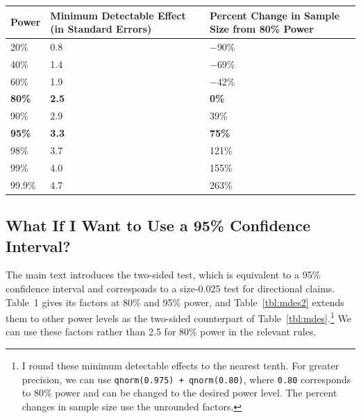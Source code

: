 \documentclass[12pt]{article}
\let\origtable\table
\let\endorigtable\endtable
\renewenvironment{table}[1][]{\origtable[htbp]}{\endorigtable}
\newcommand{\headrow}{}
\begin{document}
\begin{table}[h]
\centering
\caption{This table shows the minimum detectable effect, in standard errors, for a variety of power levels. We can use these values to find the minimum detectable effect for power levels other than 80\% and 95\% (as in Rule~\ref{rule:se-to-mde}). We can also use these factors rather than 2.5 for 80\% power (or 3.3 for 95\% power) in the relevant rules. For convenience, this table also shows the percent change in sample size required to change the statistical power from 80\% to the various levels.}\label{tbl:mdes}
\footnotesize %
\renewcommand{\tabularxcolumn}[1]{>{\centering\arraybackslash}m{#1}} %
\setlength{\extrarowheight}{4pt} %
\begin{tabularx}{\linewidth}{XXX} %
\toprule
\headrow \textbf{Power} & \textbf{Minimum Detectable Effect (in Standard Errors)} & \textbf{Percent Change in Sample Size from 80\% Power} \\
\midrule
20\%   & 0.8 & $-$90\% \\
40\%   & 1.4 & $-$69\% \\
60\%   & 1.9 & $-$42\% \\
\textbf{80\%}   & \textbf{2.5} & \textbf{0\%} \\
90\%   & 2.9 & 39\% \\
\textbf{95\%}   & \textbf{3.3} & \textbf{75\%} \\
98\%   & 3.7 & 121\% \\
99\%   & 4.0 & 155\% \\
99.9\%  & 4.7 & 263\% \\
\bottomrule
\end{tabularx}
\end{table}

\subsection*{What If I Want to Use a 95\% Confidence Interval?}

The main text introduces the two-sided test, which is equivalent to a 95\% confidence interval and corresponds to a size-0.025 test for directional claims.
Table~1 gives its factors at 80\% and 95\% power, and Table~\ref{tbl:mdes2} extends them to other power levels as the two-sided counterpart of Table~\ref{tbl:mdes}.\footnote{
  I round these minimum detectable effects to the nearest tenth.
  For greater precision, we can use \texttt{qnorm(0.975) + qnorm(0.80)}, where \texttt{0.80} corresponds to 80\% power and can be changed to the desired power level. The percent changes in sample size use the unrounded factors.
  }
We can use these factors rather than 2.5 for 80\% power in the relevant rules.
\end{document}
